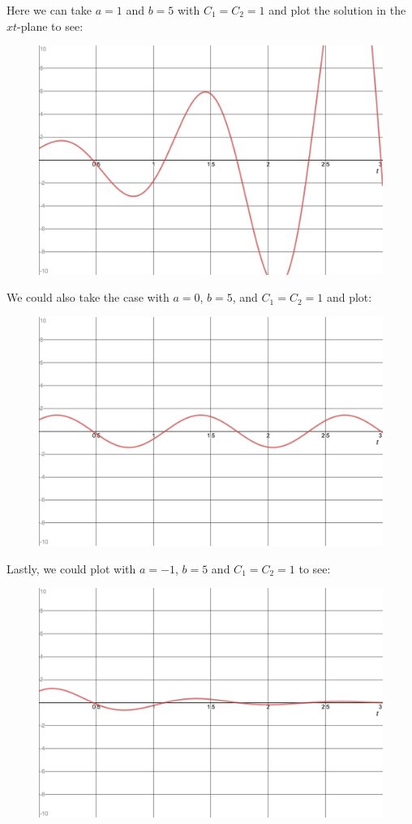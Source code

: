 \begin{itemize}
            Here we can take $a=1$ and $b=5$ with $C_1=C_2=1$ and plot the solution in the $xt$-plane to see:
            \begin{figure}[H]
                \centering
                \includegraphics[width=.7\textwidth]{Figures_Part_2/a=1-b=5.png}
            \end{figure}
            We could also take the case with $a=0$, $b=5$, and $C_1=C_2=1$ and plot:
            \begin{figure}[H]
                \centering
                \includegraphics[width=.7\textwidth]{Figures_Part_2/a=0-b=5.png}
            \end{figure}
            Lastly, we could plot with $a=-1$, $b=5$ and $C_1=C_2=1$ to see:
                        \begin{figure}[H]
                \centering
                \includegraphics[width=.7\textwidth]{Figures_Part_2/a=-1-b=5.png}
            \end{figure}
        \end{itemize}
        
